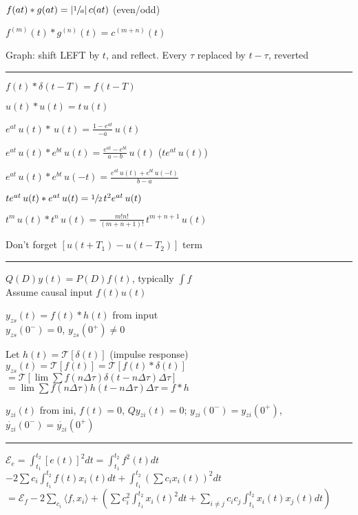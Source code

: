 \documentclass[4pt]{article}
\theoremstyle{definition}
\theoremstyle{definition}
\begin{document}
\begin{multicols}{3}
     $f(at) * g(at) = |\sfrac{1}{a}|\, c(at)$ (even/odd)

     $f^{(m)} (t) * g^{(n)} (t) = c^{(m+n)}(t)$


    Graph: shift LEFT by $t$, and reflect. Every $\tau$ replaced by $t-\tau$, reverted
\rule{\linewidth}{0.5pt}
    $f(t) * \delta(t-T) = f(t-T)$
    
    $u(t) * u(t) = t \, u(t)$

    $e^{at} \,u(t)* \,u(t) = \frac{1-e^{at}}{-a}\, u(t)$

    $e^{at}\,u(t) * e^{bt}\,u(t) = \frac{e^{at} - e^{bt}}{a - b}\, u(t)$ ($te^{at} \, u(t)$) 

    $e^{at}\, u(t) * e^{bt} \,u(-t) = \frac{e^{at} \, u(t) + e^{bt} \, u(-t)}{b-a}$

    $te^{at}\,u(t) * e^{at} \,u(t)= \sfrac{1}{2} \,t^2e^{at} \, u(t)$

    $t^m\, u(t) * t^n \, u(t) = \frac{m!n!}{(m+n+1)!}\, t^{m+n+1} \, u(t)$

    Don't forget $[u(t+T_1) - u(t-T_2)]$ term
\rule{\linewidth}{0.5pt}
    $Q(D) y(t) = P(D) f(t)$, typically $\int f$\\
    Assume causal input $f(t) u(t)$

    $y_{zs}(t) = f(t) * h(t)$ from input\\    
        $y_{zs}(0^-) = 0$, $y_{zs}(0^+) \neq 0$

        Let $h(t) = \mathcal{T} [\delta (t)]$ (impulse response)
            $y_{zs}(t)=\mathcal{T} [f(t)] = \mathcal{T} [f(t) * \delta (t)]$\\
            $=\mathcal{T}[\lim\sum f(n\Delta\tau) \delta(t - n\Delta\tau) \Delta\tau]$\\
            $=\lim\sum f(n\Delta\tau) h(t-n\Delta\tau)\Delta\tau = f * h$
            
        $y_{zi}(t)$ from ini, $f(t)=0$,
            $Q y_{zi}(t) = 0$;
            $y_{zi}(0^-) = y_{zi}(0^+)$, $\dot{y_{zi}}(0^-) = \dot{y_{zi}}(0^+)$
\rule{\linewidth}{0.5pt}
    $\mathcal{E}_e = \int_{t_1}^{t_2} [e(t)]^2 dt = \int_{t_1}^{t_2} f^2(t)dt$\\
    $- 2\sum c_i \int_{t_1}^{t_2} f(t) x_i(t) dt + \int_{t_1}^{t_2} (\sum c_i x_i(t))^2 dt$\\
    $    = \mathcal{E}_f -  2\sum_{c_i} \langle f, x_i \rangle +
    (\sum c_i^2 \int_{t_1}^{t_2} x_i(t)^2 dt + \sum_{i\neq j} c_i c_j \int_{t_1}^{t_2} x_i(t) x_j(t) dt)$
        

\end{multicols}
\end{document}
